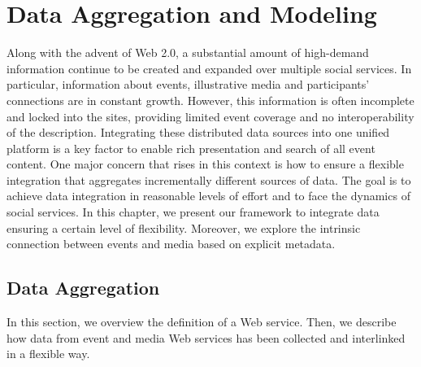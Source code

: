 \chapter{Data Aggregation and Modeling}   \label{ch:data-aggregation}
\graphicspath{{Part1/Chapter1/figures/}}

Along with the advent of Web 2.0, a substantial amount of high-demand information continue to be created and expanded over multiple social services. In particular, information about events, illustrative media and participants' connections are in constant growth. However, this information is often incomplete and locked into the sites, providing limited event coverage and no interoperability of the description. Integrating these distributed data sources into one unified platform is a key factor to enable rich presentation and search of all event content. One major concern that rises in this context is how to ensure a flexible integration that aggregates incrementally different sources of data. The goal is to achieve data integration in reasonable levels of effort and to face the dynamics of social services. In this chapter, we present our framework to integrate data ensuring a certain level of flexibility. Moreover, we explore the intrinsic connection between events and media based on explicit metadata.

\section{Data Aggregation}   \label{sec:data-scraping}
In this section, we overview the definition of a Web service. Then, we describe how data from event and media Web services has been collected and interlinked in a flexible way.

